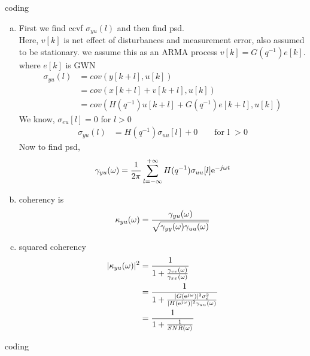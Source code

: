 \documentclass[11pt,paper=a4,answers]{exam}
\begin{document}
\begin{questions}
\question coding
\question 
\begin{enumerate}[a.]
    \item First we find ccvf $\sigma_{yu}(l)$ and then find psd.\\
    Here, $v[k]$ is net effect of disturbances and measurement error, also assumed to be stationary. we assume this as an ARMA process $v[k] = G(q^{-1})e[k]$. where $e[k]$ is GWN
    \begin{align}
        \sigma_{yu}(l) &= cov(y[k+l], u[k]) \\
        &= cov(x[k+l] + v[k+l], u[k]) \\
        &= cov(H(q^{-1})u[k+l] + G(q^{-1})e[k+l], u[k])
    \end{align}
We know, $\sigma_{eu}[l] = 0$ for $l>0$
    \begin{align*}
        \sigma_{yu}(l) &= H(q^{-1})\sigma_{uu}[l] + 0 \qquad \text{for l } > 0
    \end{align*}
    Now to find psd,
    $$\gamma_{yu}(\omega) = {1 \over 2\pi} \sum_{l=-\infty}^{+\infty} H(q^{-1})\sigma_{uu}[l] \mathrm{e} ^{-j\omega t}$$
\item coherency is
\begin{align*}
    \kappa_{yu}(\omega) &= {\gamma_{yu}(\omega) \over \sqrt{\gamma_{yy}(\omega)\gamma_{uu}(\omega)}} \\
\end{align*}

\item squared coherency
\begin{align*}
    |\kappa_{yu}(\omega)|^2 &= \frac{1}{1 + {\gamma_{vv}(\omega) \over \gamma_{xx}(\omega)}}\\
    &= \frac{1}{1 + {|G(\mathrm{e} ^{j\omega})|^2 \sigma_e^2 \over |H(\mathrm{e} ^{j\omega})|^2 \gamma_{uu}(\omega)}} \\
    &= \frac{1}{1 + {1 \over SNR(\omega)}}
\end{align*}
\end{enumerate}

\question coding


\end{questions}
\end{document}
